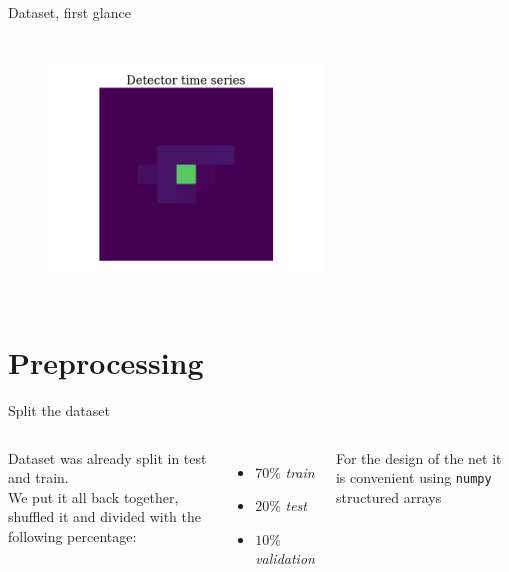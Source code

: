 \documentclass{beamer}
\begin{document}
\begin{frame}{Dataset, first glance}
\begin{columns}
         \begin{figure}
            \centering
            \includegraphics[width=0.65\textwidth]{figures/ezgif.com-gif-maker.png}
            \label{fig:my_label}
        \end{figure}
    
    \end{columns}

\end{frame}


\section{Preprocessing}

\begin{frame}{Split the dataset}

    \begin{columns}
    
    Dataset was already split in test and train.\\
    \vspace{10 pt}
    We put it all back together, shuffled it and divided with the following percentage:
    \begin{itemize}
        \item[\textbullet] $70\%$ \textit{train}
        \item[\textbullet] $20\%$ \textit{test}
        \item[\textbullet] $10\%$ \textit{validation}
        
    \end{itemize}
    \vspace{10 pt}

    For the design of the net it is convenient using \texttt{numpy} structured arrays
    
    
    
    
    \end{columns}

    

\end{frame}
\end{document}
